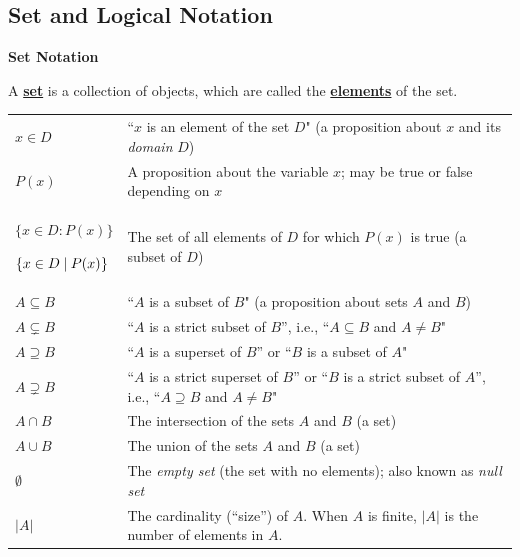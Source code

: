 \documentclass[11pt]{article}
\newcommand\st{:}
\renewcommand\emph[1]{\underline{\bf{#1}}} %
\theoremstyle{definition}
\begin{document}
\subsection{Set and Logical Notation}



{\bf Set Notation}

 A \emph{set} is a collection of objects, which are called the \emph{elements} of the set.


\vspace*{8pt}
\begin{tabular}{L{1in}L{5in}}
$x\in D$ & ``$x$ is an element of the set $D$"  (a proposition about $x$ and its {\it domain} $D$)\\

$P(x)$ & A proposition about the variable $x$; may be true or false depending on $x$ \\

$\{x \in D\st P(x)\}$ 

$\{x\in D \hspace*{2.5pt}|\hspace*{2.5pt} P(x)\hspace*{.25pt}\}$ & The set of all elements of $D$ for which $P(x)$ is true (a subset of $D$)\\ 

$A \subseteq B$ & ``$A$ is a subset of $B$"  (a proposition about sets $A$ and $B$)\\

$A \subsetneq B$ & ``$A$ is a strict subset of $B$'', i.e., ``$A\subseteq B$ and $A \neq B$" \\
$A \supseteq B$ & ``$A$ is a superset of $B$'' or ``$B$ is a subset of $A$" \\

$A \supsetneq B$ &  ``$A$ is a strict superset of $B$'' or ``$B$ is a strict subset of $A$'',  i.e., ``$A\supseteq B$ and $A \neq B$"   \\ 


$A \cap B$ & The intersection of the sets $A$ and $B$  (a set)\\

$A \cup B$ & The union of the sets $A$ and $B$  (a set)\\

$\emptyset$ & The {\it empty set} (the set with no elements); also known as {\it null set}\\
$|A|$ & The cardinality (``size'') of $A$. When $A$ is finite, $|A|$ is the number of elements in $A$.
\end{tabular}
\end{document}
